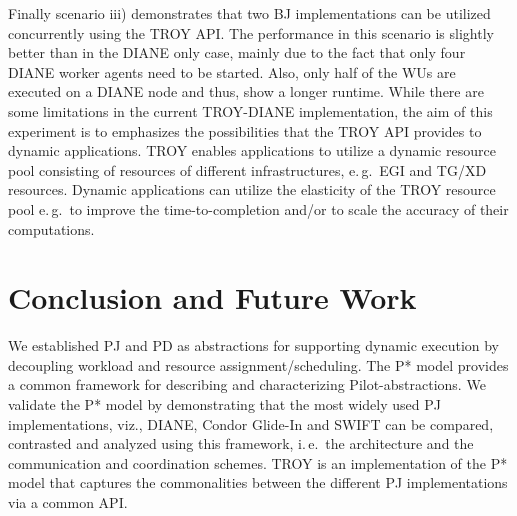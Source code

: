 \documentclass[conference,final]{IEEEtran}
\newcommand{\upp}{\vspace*{-0.5em}}
\begin{document}

Finally scenario iii) demonstrates that two BJ implementations
can be utilized concurrently using the TROY
API. The performance in this scenario is slightly better than in the
DIANE only case, mainly due to the fact that only four DIANE worker
agents need to be started. Also, only half of the WUs are executed on
a DIANE node and thus, show a longer runtime. While there are some
limitations in the current TROY-DIANE implementation, the aim of this
experiment is to emphasizes the possibilities that the TROY API
provides to dynamic applications. TROY enables applications to utilize
a dynamic resource pool consisting of resources of different
infrastructures, e.\,g.\ EGI and TG/XD resources. Dynamic applications
can utilize the elasticity of the TROY resource pool e.\,g.\ to
improve the time-to-completion and/or to scale the accuracy of their
computations.



\upp


\section{Conclusion and Future Work\upp\upp}


We established PJ and PD as abstractions for supporting dynamic
execution by decoupling workload and resource
assignment/scheduling. The P* model provides a common framework for
describing and characterizing Pilot-abstractions.  We validate the P*
model by demonstrating that the most widely used PJ implementations,
viz., DIANE, Condor Glide-In and SWIFT can be compared, contrasted and
analyzed using this framework, i.\,e.\ the architecture and the
communication and coordination schemes.  TROY is an implementation of
the P* model that captures the commonalities between the different PJ
implementations via a common API.
\end{document}
